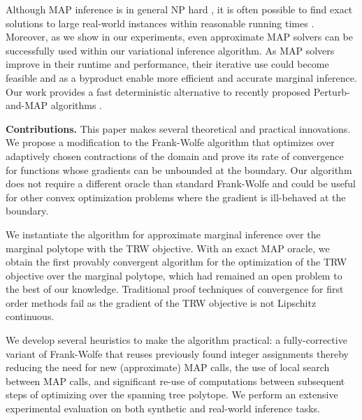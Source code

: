 %
Although MAP inference is in general NP hard \citep{MAP_NP_Hard},
it is often possible to find exact solutions to large real-world
instances within reasonable running times 
\citep{SontagEtAl_uai08, allouche2010toulbar2,kappes2013comparative}. 
Moreover, as we show in our experiments, even approximate MAP solvers
can be successfully used within our variational inference algorithm.
As MAP solvers improve in their
runtime and performance, their iterative use could become feasible and as a byproduct enable more efficient and accurate
marginal inference. Our work provides a fast deterministic alternative to
recently proposed Perturb-and-MAP algorithms
\citep{papandreou2011perturb, hazan2012partition, ermonWISH}.

\textbf{Contributions.} 
This paper makes several theoretical and practical innovations. 
%
%
We propose a modification to the Frank-Wolfe algorithm that 
optimizes over adaptively chosen contractions of the domain and prove its 
rate of convergence for functions
whose gradients can be unbounded at the boundary.  
Our algorithm does not require a different oracle than standard Frank-Wolfe and could be 
%
useful for other convex optimization problems where the gradient is ill-behaved at the boundary.

We instantiate the algorithm for approximate marginal inference over the marginal polytope 
with the TRW objective.
With an exact MAP oracle, we obtain the first provably convergent algorithm 
for the optimization of the TRW objective over the marginal polytope, 
which had remained an open problem to the best of our knowledge.
%
%
%
%
Traditional proof techniques of convergence for first order methods fail as the gradient of the TRW objective is not Lipschitz continuous. 

We develop several heuristics to
make the algorithm practical: a fully-corrective
variant of Frank-Wolfe that reuses previously found integer
assignments thereby reducing the need for new (approximate) MAP
calls, the use of local search between MAP calls, 
and significant re-use of computations between
subsequent steps of optimizing over the spanning tree
polytope.
We perform an extensive experimental evaluation on both synthetic and real-world inference tasks. 
